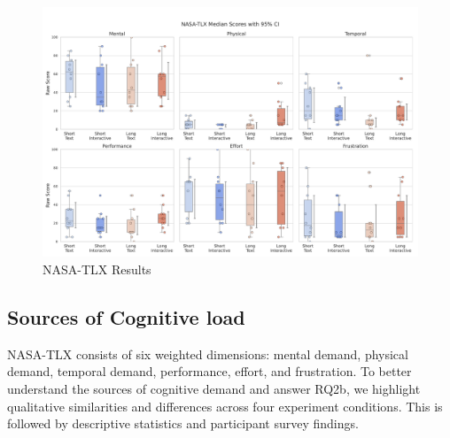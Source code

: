 
\begin{figure}[ht]
    \centering
    \includegraphics[width=\textwidth]{content/image/results/nasatlx_final_value_with_CI.pdf}
    \caption{NASA-TLX Results}
    \label{fig:nasatlx-with-ci}
\end{figure}


\subsection{Sources of Cognitive load}
NASA-TLX consists of six weighted dimensions: mental demand, physical demand, temporal demand, performance, effort, and frustration. To better understand the sources of cognitive demand and answer RQ2b, we highlight qualitative similarities and differences across four experiment conditions. This is followed by descriptive statistics and participant survey findings.

